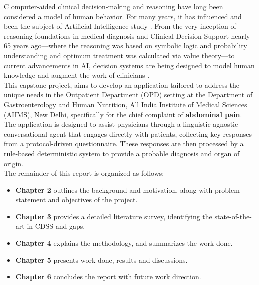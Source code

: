 \lettrine{C}{ }omputer-aided clinical decision-making and reasoning have long been considered a model of human behavior. For many years, it has influenced and been the subject of Artificial Intelligence study \cite{cohen2022introducing}. From the very inception of reasoning foundations in medical diagnosis and Clinical Decision Support nearly 65 years ago---where the reasoning was based on symbolic logic and probability understanding and optimum treatment was calculated via value theory---to current advancements in AI, decision systems are being designed to model human knowledge and augment the work of clinicians \cite{ledley1959reasoning, rajkomar2019machine}.\\

\noindent This capstone project, aims to develop an application tailored to address the unique needs in the Outpatient Department (OPD) setting at the Department of Gastroenterology and Human Nutrition, All India Institute of Medical Sciences (AIIMS), New Delhi, specifically for the chief complaint of \textcolor{TUMRed}{\textbf{abdominal pain}}. The application is designed to assist physicians through a linguistic-agnostic conversational agent that engages directly with patients, collecting key responses from a protocol-driven questionnaire. These responses are then processed by a rule-based deterministic system to provide a probable diagnosis and organ of origin.\\

\noindent The remainder of this report is organized as follows:
\begin{itemize}
    \item \textcolor{TUMRed}{\textbf{Chapter 2}} outlines the background and motivation, along with problem statement and objectives of the project.
    \item \textcolor{TUMRed}{\textbf{Chapter 3}} provides a detailed literature survey, identifying the state-of-the-art in CDSS and gaps.
    \item \textcolor{TUMRed}{\textbf{Chapter 4}} explains the methodology, and summarizes the work done.
    \item \textcolor{TUMRed}{\textbf{Chapter 5}} presents work done, results and discussions.
    \item \textcolor{TUMRed}{\textbf{Chapter 6}} concludes the report with future work direction.
\end{itemize}